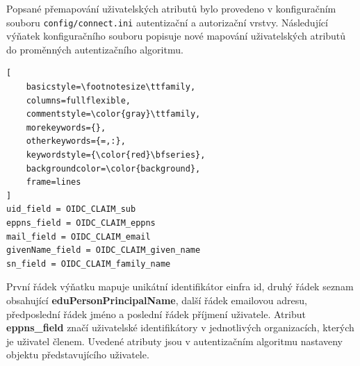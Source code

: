 \documentclass[
  printed, %
  twoside, %
  table,   %
  nolof,     %
  nolot,     %
]{fithesis3}
\begin{document}
Popsané přemapování uživatelských atributů bylo provedeno v konfiguračním souboru \texttt{config/connect.ini} autentizační a autorizační vrstvy. Následující výňatek konfiguračního souboru popisuje nové mapování uživatelských atributů do proměnných autentizačního algoritmu. 

\begin{lstlisting}[
    basicstyle=\footnotesize\ttfamily,
    columns=fullflexible,
    commentstyle=\color{gray}\ttfamily,
    morekeywords={},
    otherkeywords={=,:},
    keywordstyle={\color{red}\bfseries},
    backgroundcolor=\color{background},
    frame=lines
]
uid_field = OIDC_CLAIM_sub
eppns_field = OIDC_CLAIM_eppns
mail_field = OIDC_CLAIM_email
givenName_field = OIDC_CLAIM_given_name
sn_field = OIDC_CLAIM_family_name
\end{lstlisting}
První řádek výňatku mapuje unikátní identifikátor einfra id, druhý řádek seznam obsahující \textbf{eduPersonPrincipalName}, další řádek emailovou adresu, předposlední řádek jméno a poslední řádek příjmení uživatele. Atribut \textbf{eppns\_field} značí uživatelské identifikátory v jednotlivých organizacích, kterých je uživatel členem. Uvedené atributy jsou v autentizačním algoritmu nastaveny objektu představujícího uživatele. 
\par 
\end{document}
